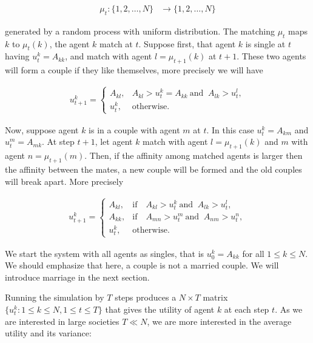 \documentclass[12pt]{article}
\begin{document}
\begin{align}
    \mu_t:\{1,2,\dots,N\} & \rightarrow \{1,2,\dots,N\}
    \label{matching}
\end{align}

\noindent generated by a random process with uniform distribution. The matching $\mu_t$ maps $k$ to $\mu_t(k)$, the agent $k$ match at $t$. Suppose first, that agent $k$ is single at $t$ having $u_t^k=A_{kk}$, and match with agent $l=\mu_{t+1}(k)$ at $t+1$. These two agents will form a couple if they like themselves, more precisely we will have

\begin{align}
    u_{t+1}^k=\begin{cases} A_{kl}, & A_{kl}>u_t^k=A_{kk}\ \textrm{and }\ A_{lk}>u_{t}^l,\\
    u_t^k, & \textrm{otherwise}.
    \end{cases}
    \label{singleevolution}
\end{align}

\noindent Now, suppose agent $k$ is in a couple with agent $m$ at $t$. In this case $u_t^k=A_{km}$ and $u_t^m=A_{mk}$. At step $t+1$, let agent $k$ match with agent $l=\mu_{t+1}(k)$ and $m$ with agent $n=\mu_{t+1}(m)$. Then, if the affinity among matched agents is larger then the affinity between the mates, a new couple will be formed and the old couples will break apart. More precisely

\begin{align}
    u_{t+1}^k=\begin{cases} A_{kl}, & \textrm{if}\quad A_{kl}>u_t^k\ \textrm{and }\ A_{lk}>u_{t}^l,\\
    A_{kk}, & \textrm{if}\quad A_{mn}>u_t^m\ \textrm{and }\ A_{nm}>u_t^n,\\
    u_t^k, & \textrm{otherwise}.
    \end{cases}
    \label{coupleevolution}
\end{align}

\noindent We start the system with all agents as singles, that is $u_0^k=A_{kk}$ for all $1\leq k\leq N$. We should emphasize that here, a couple is not a married couple. We will introduce marriage in the next section. 

Running the simulation by $T$ steps produces a $N\times T$ matrix $\{u_t^k:1\leq k\leq N,1\leq t\leq T\}$ that gives the utility of agent $k$ at each step $t$. As we are interested in large societies $T\ll N$, we are more interested in the average utility and its variance:
\end{document}
